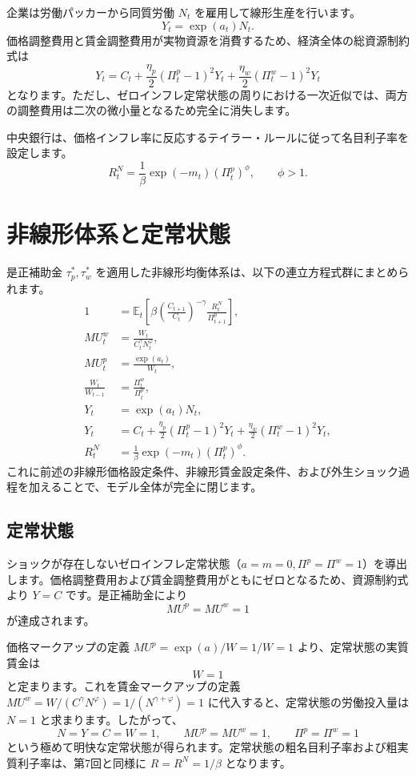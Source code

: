 \documentclass[
  japanese,
  lualatex,
  ja=standard,
  12pt,
  a4paper]{ltjsarticle}
\begin{document}
企業は労働パッカーから同質労働 \(N_t\) を雇用して線形生産を行います。 \[
Y_t=\exp(a_t)N_t.
\]
価格調整費用と賃金調整費用が実物資源を消費するため、経済全体の総資源制約式は
\[
Y_t
=
C_t
+
\frac{\eta_p}{2}(\Pi_t^p-1)^2Y_t
+
\frac{\eta_w}{2}(\Pi_t^w-1)^2Y_t
\]
となります。ただし、ゼロインフレ定常状態の周りにおける一次近似では、両方の調整費用は二次の微小量となるため完全に消失します。

中央銀行は、価格インフレ率に反応するテイラー・ルールに従って名目利子率を設定します。
\[
R_t^N
=
\frac{1}{\beta}\exp(-m_t)(\Pi_t^p)^\phi,
\qquad
\phi>1.
\]

\section{非線形体系と定常状態}\label{ux975eux7ddaux5f62ux4f53ux7cfbux3068ux5b9aux5e38ux72b6ux614b}

是正補助金 \(\tau_p^*, \tau_w^*\)
を適用した非線形均衡体系は、以下の連立方程式群にまとめられます。 \[
\begin{aligned}
1
&=
\mathbb{E}_t
\left[
\beta
\left(\frac{C_{t+1}}{C_t}\right)^{-\gamma}
\frac{R_t^N}{\Pi_{t+1}^p}
\right],
\\
MU_t^w
&=
\frac{W_t}{C_t^\gamma N_t^\varphi},
\\
MU_t^p
&=
\frac{\exp(a_t)}{W_t},
\\
\frac{W_t}{W_{t-1}}
&=
\frac{\Pi_t^w}{\Pi_t^p},
\\
Y_t
&=
\exp(a_t)N_t,
\\
Y_t
&=
C_t
+
\frac{\eta_p}{2}(\Pi_t^p-1)^2Y_t
+
\frac{\eta_w}{2}(\Pi_t^w-1)^2Y_t,
\\
R_t^N
&=
\frac{1}{\beta}\exp(-m_t)(\Pi_t^p)^\phi.
\end{aligned}
\]
これに前述の非線形価格設定条件、非線形賃金設定条件、および外生ショック過程を加えることで、モデル全体が完全に閉じます。

\subsection{定常状態}\label{ux5b9aux5e38ux72b6ux614b}

ショックが存在しないゼロインフレ定常状態（\(a=m=0, \Pi^p=\Pi^w=1\)）を導出します。価格調整費用および賃金調整費用がともにゼロとなるため、資源制約式より
\(Y=C\) です。是正補助金により \[
MU^p=MU^w=1
\] が達成されます。

価格マークアップの定義 \(MU^p = \exp(a)/W = 1/W = 1\)
より、定常状態の実質賃金は \[
W=1
\] と定まります。これを賃金マークアップの定義
\(MU^w = W/(C^\gamma N^\varphi) = 1/(N^{\gamma+\varphi}) = 1\)
に代入すると、定常状態の労働投入量は \(N=1\) と求まります。したがって、
\[
N=Y=C=W=1,
\qquad
MU^p=MU^w=1,
\qquad
\Pi^p=\Pi^w=1
\]
という極めて明快な定常状態が得られます。定常状態の粗名目利子率および粗実質利子率は、第7回と同様に
\(R=R^N=1/\beta\) となります。
\end{document}
